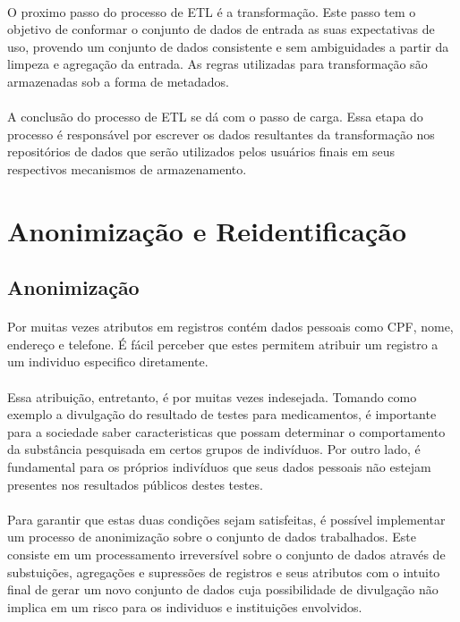 \paragraph{} O proximo passo do processo de ETL é a transformação. Este passo tem o objetivo de conformar o conjunto de dados de entrada as suas expectativas de uso, provendo um conjunto de dados consistente e sem ambiguidades a partir da limpeza e agregação da entrada. As regras utilizadas para transformação são armazenadas sob a forma de metadados.

\paragraph{} A conclusão do processo de ETL se dá com o passo de carga. Essa etapa do processo é responsável por escrever os dados resultantes da transformação nos repositórios de dados que serão utilizados pelos usuários finais em seus respectivos mecanismos de armazenamento.

\section{Anonimização e Reidentificação}

\subsection{Anonimização}

\paragraph{} Por muitas vezes atributos em registros contém dados pessoais como CPF, nome, endereço e telefone. É fácil perceber que estes permitem atribuir um registro a um individuo especifico diretamente.

\paragraph{} Essa atribuição, entretanto, é por muitas vezes indesejada. Tomando como exemplo a divulgação do resultado de testes para medicamentos, é importante para a sociedade saber caracteristicas que possam determinar o comportamento da 
substância pesquisada em certos grupos de indivíduos. Por outro lado, é fundamental para os próprios indivíduos que seus dados pessoais não estejam presentes nos resultados públicos destes testes. 

\paragraph{} Para garantir que estas duas condições sejam satisfeitas, é possível implementar um processo de anonimização sobre o conjunto de dados trabalhados. Este consiste em um processamento irreversível\cite{dias2016multilingual} sobre o conjunto de dados através de substuições, agregações e supressões de registros e seus atributos com o intuito final de gerar um novo conjunto de dados cuja possibilidade de divulgação não implica em um risco para os individuos e instituições envolvidos. 

